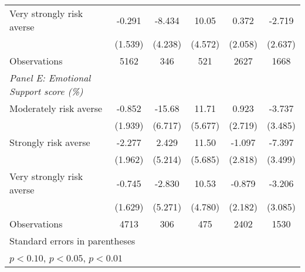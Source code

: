 {\begin{tabular}{l*{5}{c}}
Very strongly risk averse&      -0.291         &      -8.434\sym{**} &       10.05\sym{**} &       0.372         &      -2.719         \\
                    &     (1.539)         &     (4.238)         &     (4.572)         &     (2.058)         &     (2.637)         \\
\midrule
Observations        &        5162         &         346         &         521         &        2627         &        1668         \\
\midrule
\textit{Panel E: Emotional Support score (\%)} & & & & & \\
Moderately risk averse&      -0.852         &      -15.68\sym{**} &       11.71\sym{**} &       0.923         &      -3.737         \\
                    &     (1.939)         &     (6.717)         &     (5.677)         &     (2.719)         &     (3.485)         \\

Strongly risk averse&      -2.277         &       2.429         &       11.50\sym{**} &      -1.097         &      -7.397\sym{**} \\
                    &     (1.962)         &     (5.214)         &     (5.685)         &     (2.818)         &     (3.499)         \\
Very strongly risk averse&      -0.745         &      -2.830         &       10.53\sym{**} &      -0.879         &      -3.206         \\
                    &     (1.629)         &     (5.271)         &     (4.780)         &     (2.182)         &     (3.085)         \\
\midrule
Observations        &        4713         &         306         &         475         &        2402         &        1530         \\
\bottomrule
\multicolumn{6}{l}{\footnotesize Standard errors in parentheses}\\
\multicolumn{6}{l}{\footnotesize \sym{*} \(p<0.10\), \sym{**} \(p<0.05\), \sym{***} \(p<0.01\)}\\
\end{tabular}
}
